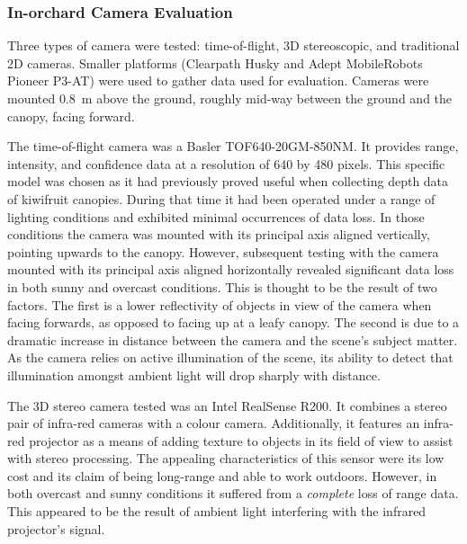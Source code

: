 \documentclass[preprint,authoryear,12pt]{elsarticle}
\begin{document}
    \subsubsection{In-orchard Camera Evaluation}
        \label{sect:camera_evaluation}

        Three types of camera were tested: time-of-flight, 3D stereoscopic, and traditional 2D cameras.
        Smaller platforms (Clearpath Husky and Adept MobileRobots Pioneer P3-AT) were used to gather data used for evaluation.
        Cameras were mounted \SI{0.8}{\meter} above the ground, roughly mid-way between the ground and the canopy, facing forward.

        The time-of-flight camera was a Basler TOF640-20GM-850NM.
        It provides range, intensity, and confidence data at a resolution of 640 by 480 pixels.
        This specific model was chosen as it had previously proved useful when collecting depth data of kiwifruit canopies.
        During that time it had been operated under a range of lighting conditions and exhibited minimal occurrences of data loss.
        In those conditions the camera was mounted with its principal axis aligned vertically, pointing upwards to the canopy.
        However, subsequent testing with the camera mounted with its principal axis aligned horizontally revealed significant data loss in both sunny and overcast conditions.
        This is thought to be the result of two factors.
        The first is a lower reflectivity of objects in view of the camera when facing forwards, as opposed to facing up at a leafy canopy.
        The second is due to a dramatic increase in distance between the camera and the scene's subject matter.
        As the camera relies on active illumination of the scene, its ability to detect that illumination amongst ambient light will drop sharply with distance.

        The 3D stereo camera tested was an Intel RealSense R200.
        It combines a stereo pair of infra-red cameras with a colour camera.
        Additionally, it features an infra-red projector as a means of adding texture to objects in its field of view to assist with stereo processing.
        The appealing characteristics of this sensor were its low cost and its claim of being long-range and able to work outdoors.
        However, in both overcast and sunny conditions it suffered from a \emph{complete} loss of range data.
        This appeared to be the result of ambient light interfering with the infrared projector’s signal.
\end{document}
